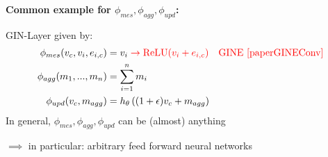 \textbf{Common example for $\phi_{mes},\phi_{agg},\phi_{upd}$:}\par
\noindent GIN-Layer \cite{paperGIN} given by:
\begin{align*}
    \phi_{mes}(v_c, v_i, e_{i,c})&=v_i \color{red}\to \text{ReLU}(v_i+e_{i,c}) \quad \text{GINE \cite{paperGINEConv}}\\
    \phi_{agg}(m_1,...,m_n)&=\sum_{i=1}^{n}m_i\\
    \phi_{upd}(v_c,m_{agg})&=h_\theta\left((1+\epsilon)v_c+m_{agg}\right)
\end{align*}
In general, $\phi_{mes},\phi_{agg},\phi_{upd}$ can be (almost) anything\par
$\implies$ in particular: arbitrary feed forward neural networks
